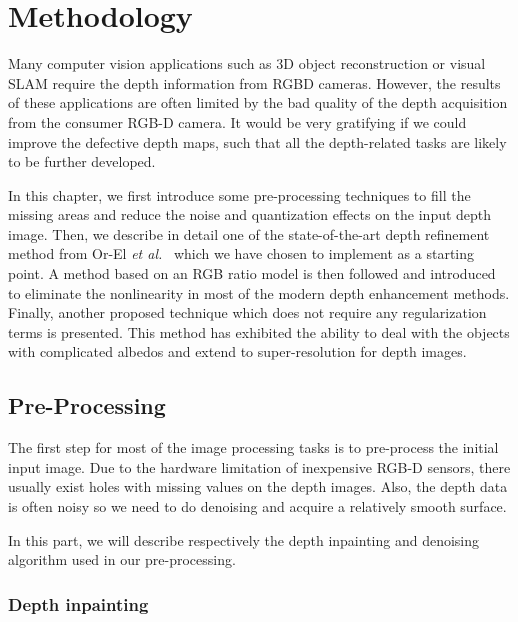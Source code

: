 \chapter{Methodology} \label{chap:methodology}
Many computer vision applications such as 3D object reconstruction or visual SLAM require the depth information from RGBD cameras. 
However, the results of these applications are often limited by the bad quality of the depth acquisition from the consumer RGB-D camera. 
It would be very gratifying if we could improve the defective depth maps, such that all the depth-related tasks are likely to be further developed.

In this chapter, we first introduce some pre-processing techniques to fill the missing areas and reduce the noise and quantization effects on the input depth image. 
Then, we describe in detail one of the state-of-the-art depth refinement method from Or-El \emph{et al.}~\cite{or2015rgbd} which we have chosen to implement as a starting point.
A method based on an RGB ratio model is then followed and introduced to eliminate the nonlinearity in most of the modern depth enhancement methods.
Finally, another proposed technique which does not require any regularization terms is presented. 
This method has exhibited the ability to deal with the objects with complicated albedos and extend to super-resolution for depth images.
 

\section{Pre-Processing}
The first step for most of the image processing tasks is to pre-process the initial input image. 
Due to the hardware limitation of inexpensive RGB-D sensors, there usually exist holes with missing values on the depth images. 
Also, the depth data is often noisy so we need to do denoising and acquire a relatively smooth surface.

In this part, we will describe respectively the depth inpainting and denoising algorithm used in our pre-processing. 
\subsection{Depth inpainting}

